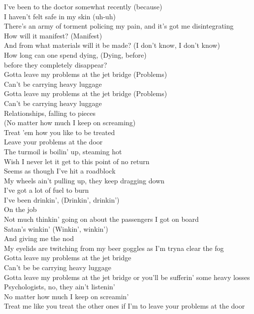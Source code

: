 


I've been to the doctor somewhat recently (because) \\
I haven't felt safe in my skin (uh-uh) \\
There's an army of torment policing my pain, and it's got me disintegrating \\
How will it manifest? (Manifest) \\
And from what materials will it be made? (I don't know, I don't know) \\
How long can one spend dying, (Dying, before) \\
before they completely disappear? \\

Gotta leave my problems at the jet bridge (Problems) \\
Can't be carrying heavy luggage \\
Gotta leave my problems at the jet bridge (Problems) \\
Can't be carrying heavy luggage \\
Relationships, falling to pieces \\
(No matter how much I keep on screaming) \\
Treat 'em how you like to be treated \\
Leave your problems at the door \\

The turmoil is boilin' up, steaming hot \\
Wish I never let it get to this point of no return \\
Seems as though I've hit a roadblock \\
My wheels ain't pulling up, they keep dragging down \\
I've got a lot of fuel to burn \\
I've been drinkin', (Drinkin', drinkin') \\
On the job \\
Not much thinkin' going on about the passengers I got on board \\
Satan's winkin' (Winkin', winkin') \\
And giving me the nod \\
My eyelids are twitching from my beer goggles as I'm tryna clear the fog \\

Gotta leave my problems at the jet bridge \\
Can't be be carrying heavy luggage \\
Gotta leave my problems at the jet bridge or you'll be sufferin' some heavy losses \\
Psychologists, no, they ain't listenin' \\
No matter how much I keep on screamin' \\
Treat me like you treat the other ones if I'm to leave your problems at the door \\

